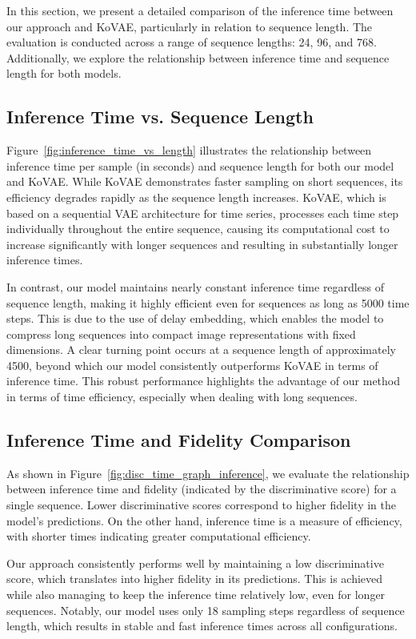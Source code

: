 \documentclass{article}
\theoremstyle{plain}
\theoremstyle{definition}
\theoremstyle{remark}
\begin{document}
{In this section, we present a detailed comparison of the inference time between our approach and KoVAE, particularly in relation to sequence length. The evaluation is conducted across a range of sequence lengths: 24, 96, and 768. Additionally, we explore the relationship between inference time and sequence length for both models.

\subsection{Inference Time vs. Sequence Length}

{Figure~\ref{fig:inference_time_vs_length} illustrates the relationship between inference time per sample (in seconds) and sequence length for both our model and KoVAE. While KoVAE demonstrates faster sampling on short sequences, its efficiency degrades rapidly as the sequence length increases. KoVAE, which is based on a sequential VAE architecture for time series, processes each time step individually throughout the entire sequence, causing its computational cost to increase significantly with longer sequences and resulting in substantially longer inference times.}

In contrast, our model maintains nearly constant inference time regardless of sequence length, making it highly efficient even for sequences as long as 5000 time steps. This is due to the use of delay embedding, which enables the model to compress long sequences into compact image representations with fixed dimensions. A clear turning point occurs at a sequence length of approximately 4500, beyond which our model consistently outperforms KoVAE in terms of inference time. This robust performance highlights the advantage of our method in terms of time efficiency, especially when dealing with long sequences.

\subsection{Inference Time and Fidelity Comparison}

As shown in Figure~\ref{fig:disc_time_graph_inference}, we evaluate the relationship between inference time and fidelity (indicated by the discriminative score) for a single sequence. Lower discriminative scores correspond to higher fidelity in the model’s predictions. On the other hand, inference time is a measure of efficiency, with shorter times indicating greater computational efficiency.

Our approach consistently performs well by maintaining a low discriminative score, which translates into higher fidelity in its predictions. This is achieved while also managing to keep the inference time relatively low, even for longer sequences. Notably, our model uses only 18 sampling steps regardless of sequence length, which results in stable and fast inference times across all configurations.

}
\end{document}
